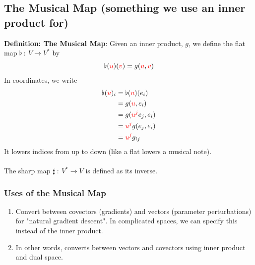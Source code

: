 \documentclass[10pt]{article}
\begin{document}
\subsection*{The Musical Map (something we use an inner product for)}
\textbf{Definition: The Musical Map}: Given an inner product, $g$, we define the flat map $\flat \::\: V \rightarrow V^*$ by
\[\flat(\textcolor{red}{u})(\textcolor{red}{v}) = g(\textcolor{red}{u}, \textcolor{red}{v})\]
In coordinates, we write
\begin{align*}
    \flat(\textcolor{red}{u})_i &= \flat(\textcolor{red}{u})(e_i)\\
    &= g(\textcolor{red}{u}, e_i)\\
    &= g(\textcolor{red}{u^j} e_j, e_i)\\
    &= \textcolor{red}{u^j} g(e_j, e_i)\\
    &= \textcolor{red}{u^j} g_{ij}
\end{align*}
It lowers indices from up to down (like a flat lowers a musical note).\\\\
The sharp map $\sharp \::\: V^* \rightarrow V$ is defined as its inverse.
\subsubsection*{Uses of the Musical Map}
\begin{enumerate}
    \item Convert between covectors (gradients) and vectors (parameter perturbations) for "natural gradient descent".  
    In complicated spaces, we can specify this instead of the inner product.
    \item In other words, converts between vectors and covectors using inner product and dual space.
\end{enumerate}
\end{document}
